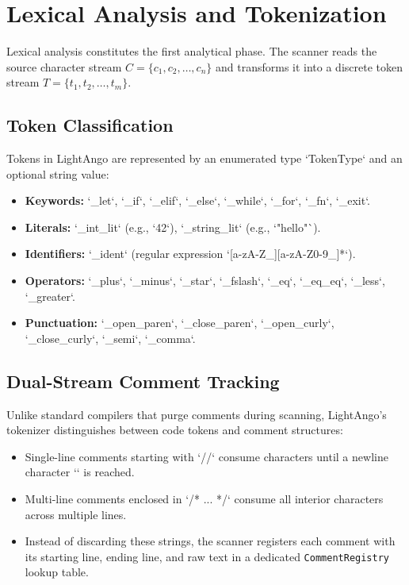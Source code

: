 \section{Lexical Analysis and Tokenization}
Lexical analysis constitutes the first analytical phase. The scanner reads the source character stream $C = \{c_1, c_2, \dots, c_n\}$ and transforms it into a discrete token stream $T = \{t_1, t_2, \dots, t_m\}$.

\subsection{Token Classification}
Tokens in LightAngo are represented by an enumerated type `TokenType` and an optional string value:
\begin{itemize}
    \item \textbf{Keywords:} `_let`, `_if`, `_elif`, `_else`, `_while`, `_for`, `_fn`, `_exit`.
    \item \textbf{Literals:} `_int_lit` (e.g., `42`), `_string_lit` (e.g., `"hello"`).
    \item \textbf{Identifiers:} `_ident` (regular expression `[a-zA-Z_][a-zA-Z0-9_]*`).
    \item \textbf{Operators:} `_plus`, `_minus`, `_star`, `_fslash`, `_eq`, `_eq_eq`, `_less`, `_greater`.
    \item \textbf{Punctuation:} `_open_paren`, `_close_paren`, `_open_curly`, `_close_curly`, `_semi`, `_comma`.
\end{itemize}

\subsection{Dual-Stream Comment Tracking}
Unlike standard compilers that purge comments during scanning, LightAngo's tokenizer distinguishes between code tokens and comment structures:
\begin{itemize}
    \item Single-line comments starting with `//` consume characters until a newline character `\n` is reached.
    \item Multi-line comments enclosed in `/* ... */` consume all interior characters across multiple lines.
    \item Instead of discarding these strings, the scanner registers each comment with its starting line, ending line, and raw text in a dedicated \texttt{CommentRegistry} lookup table.
\end{itemize}

